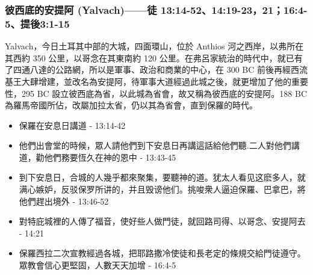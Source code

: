\subsubsection{彼西底的安提阿 (Yalvach)——徒 13:14-52、14:19-23，21；16:4-5、提後3:1-15}
Yalvach，今日土耳其中部的大城，四面環山，位於 Anthios 河之西岸，以弗所在其西約 350 公里，以哥念在其東南約 120 公里。在弗呂家統治的時代中，就已有了四通八達的公路網，所以是軍事、政治和商業的中心，在 300 BC 前後再經西流基王大肆增建，並改名為安提阿，待軍事大道經過此城之後，就更增加了他的重要性，295 BC 設立彼西底為省，以此城為省會，故又稱為彼西底的安提阿。188 BC 為羅馬帝國所佔，改屬加拉太省，仍以其為省會，直到保羅的時代。

\begin{itemize}
\itemsep-.25em 
\item 保羅在安息日講道 - 13:14-42
\item 他們出會堂的時候，眾人請他們到下安息日再講這話給他們聽.二人對他們講道，勸他們務要恆久在神的恩中 - 13:43-45
\item 到下安息日，合城的人幾乎都來聚集，要聽神的道。犹太人看见这麽多人，就满心嫉妒，反驳保罗所讲的，并且毁谤他们。挑唆衆人逼迫保羅、巴拿巴，將他們趕出境外 - 13:46-52
\item 對特庇城裡的人傳了福音，使好些人做門徒，就回路司得、以哥念、安提阿去 - 14:21
\item 保羅西拉二次宣教經過各城，把耶路撒冷使徒和長老定的條規交給門徒遵守。 眾教會信心更堅固，人數天天加增 - 16:4-5
\end{itemize}

